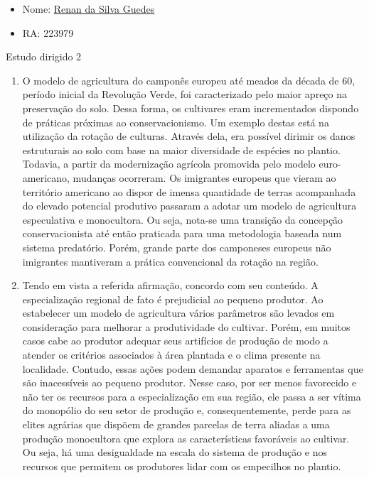 \documentclass[a4paper, 12pt]{article}
\begin{document}
	{\selectfont
	\begin{itemize}
		\item Nome: \href{https://github.com/renanGuedes10}{Renan da Silva Guedes}
		\item RA: 223979
	\end{itemize}
	\begin{center}
		\large{Estudo dirigido 2}
	\end{center}
	\begin{enumerate}
		\item O modelo de agricultura do camponês europeu até meados da década de 60, período inicial da Revolução Verde, foi caracterizado pelo maior apreço na preservação do solo. Dessa forma, os cultivares eram incrementados dispondo de práticas próximas ao conservacionismo. Um exemplo destas está na utilização da rotação de culturas. Através dela, era possível dirimir os danos estruturais ao solo com base na maior diversidade de espécies no plantio. Todavia, a partir da modernização agrícola promovida pelo modelo euro-americano, mudanças ocorreram. Os imigrantes europeus que vieram ao território americano ao dispor de imensa quantidade de terras acompanhada do elevado potencial  produtivo passaram a adotar um modelo de agricultura especulativa e monocultora. Ou seja, nota-se uma transição da concepção conservacionista até então praticada para uma metodologia baseada num sistema predatório. Porém, grande parte dos camponeses europeus não imigrantes mantiveram a prática convencional da rotação na região.
		
		\item Tendo em vista a referida afirmação, concordo com seu conteúdo. A especialização regional de fato é prejudicial ao pequeno produtor. Ao estabelecer um modelo de agricultura vários parâmetros são levados em consideração para melhorar a produtividade do cultivar. Porém, em muitos casos cabe ao produtor adequar seus artifícios de produção de modo a atender os critérios associados à área plantada e o clima presente na localidade. Contudo, essas ações podem demandar aparatos e ferramentas que são inacessíveis ao pequeno produtor. Nesse caso, por ser menos favorecido e não ter os recursos para a especialização em sua região, ele passa a ser vítima do monopólio do seu setor de produção e, consequentemente, perde para as elites agrárias que dispõem de grandes parcelas de terra aliadas a uma produção monocultora que explora as características favoráveis ao cultivar. Ou seja, há uma desigualdade na escala do sistema de produção e nos recursos que permitem os produtores lidar com os empecilhos no plantio.
		

\end{enumerate}}
\end{document}
